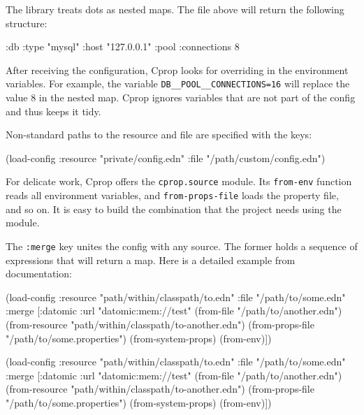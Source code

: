 The library treats dots as nested maps. The file above will return the following structure:

\begin{clojure}
{:db {:type "mysql"
      :host "127.0.0.1"
      :pool {:connections 8}}}
\end{clojure}

After receiving the configuration, Cprop looks for overriding in the environment variables. For example, the variable \texttt{DB\_\_POOL\_\_CONNEC\-TIONS=16} will replace the value 8 in the nested map. Cprop ignores variables that are not part of the config and thus keeps it tidy.

Non-standard paths to the resource and file are specified with the keys:

\begin{clojure}
(load-config
 :resource "private/config.edn"
 :file "/path/custom/config.edn")
\end{clojure}


For delicate work, Cprop offers the \verb|cprop.source| module. Its \verb|from-env| function reads all environment variables, and \verb|from-props-file| loads the property file, and so on. It is easy to build the combination that the project needs using the module.

The \verb|:merge| key unites the config with any source. The former holds a sequence of expressions that will return a map. Here is a detailed example from documentation:

\ifnarrow

\begin{clojure}
(load-config
 :resource "path/within/classpath/to.edn"
 :file "/path/to/some.edn"
 :merge
 [{:datomic {:url "datomic:mem://test"}}
  (from-file "/path/to/another.edn")
  (from-resource
  "path/within/classpath/to-another.edn")
  (from-props-file
   "/path/to/some.properties")
  (from-system-props)
  (from-env)])
\end{clojure}

\else

\begin{clojure}
(load-config
 :resource "path/within/classpath/to.edn"
 :file "/path/to/some.edn"
 :merge [{:datomic {:url "datomic:mem://test"}}
         (from-file "/path/to/another.edn")
         (from-resource "path/within/classpath/to-another.edn")
         (from-props-file "/path/to/some.properties")
         (from-system-props)
         (from-env)])
\end{clojure}

